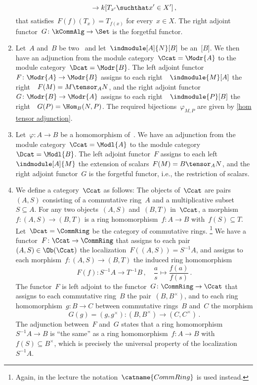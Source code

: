 \begin{example}
\begin{enumerate}
\[        \to     k[T_{x'} \suchthat x' \in X'] \,,
      \]
      that satisfies~$F(f)(T_x) = T_{f(x)}$ for every~$x \in X$.
      The right adjoint functor~$G \colon \kCommAlg \to \Set$ is the forgetful functor.
    \item
      Let~$A$ and~$B$ be two~{\kalgs} and let~$\indmodule[A]{N}[B]$ be an~{[$B$]}.
      We then have an adjunction from the module category~$\Ccat = \Modr{A}$ to the module category~$\Dcat = \Modr{B}$.
      The left adjoint functor~$F \colon \Modr{A} \to \Modr{B}$ assigns to each right~{}~$\indmodule{M}[A]$ the right~{}~$F(M) = M \tensor_A N$, and the right adjoint functor~$G \colon \Modr{B} \to \Modr{A}$ assigns to each right~{}~$\indmodule{P}[B]$ the right~{}~$G(P) = \Hom_B(N,P)$.
      The required bijections~$\varphi_{M,P}$ are given by \cref{hom tensor adjunction}.
    \item
      Let~$\varphi \colon A \to B$ be a homomorphism of~{\kalgs}.
      We have an adjunction from the module category~$\Ccat = \Modl{A}$ to the module category~$\Dcat = \Modl{B}$.
      The left adjoint functor~$F$ assigns to each left~{}~$\indmodule[A]{M}$ the extension of scalars~$F(M) = B \tensor_A N$, and the right adjoint functor~$G$ is the forgetful functor, i.e., the restriction of scalars.
    \item
      We define a category~$\Ccat$ as follows:
      The objects of~$\Ccat$ are pairs~$(A,S)$ consisting of a commutative ring~$A$ and a multiplicative subset~$S \subseteq A$.
      For any two objects~$(A,S)$ and~$(B,T)$ in~$\Ccat$, a morphism~$f \colon (A,S) \to (B,T)$ is a ring homomorphism~$f \colon A \to B$ with~$f(S) \subseteq T$.
      Let~$\Dcat = \CommRing$ be the category of commutative rings.%
      \footnote{Again, in the lecture the notation~$\catname{CommRing}$ is used instead.}
      We have a functor~$F \colon \Ccat \to \CommRing$ that assigns to each pair~$(A,S) \in \Ob(\Ccat)$ the localization~$F((A,S)) = S^{-1} A$, and assigns to each morphism~$f \colon (A,S) \to (B,T)$ the induced ring homomorphism
      \[
                F(f)
        \colon  S^{-1} A
        \to     T^{-1} B \,,
        \quad   \frac{a}{s}
        \mapsto \frac{f(a)}{f(s)} \,.
      \]
      The functor~$F$ is left adjoint to the functor~$G \colon \CommRing \to \Ccat$ that assigns to each commutative ring~$B$ the pair~$(B,B^\times)$, and to each ring homomorphism~$g \colon B \to C$ between commutative rings~$B$ and~$C$ the morphism
      \[
                G(g)
        =       (g, g^\times)
        \colon  (B, B^\times)
        \to     (C, C^\times) \,.
      \]
      The adjunction between~$F$ and~$G$ states that a ring homomorphism~$S^{-1} A \to B$ is \enquote{the same} as a ring homomorphism~$f \colon A \to B$ with~$f(S) \subseteq B^\times$, which is precisely the universal property of the localization~$S^{-1} A$.
  \end{enumerate}
\end{example}


